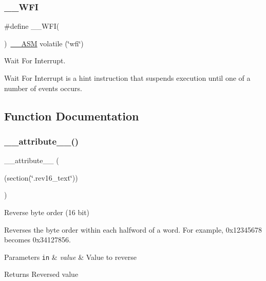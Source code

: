 \subsubsection{\texorpdfstring{\+\_\+\+\_\+\+W\+FI}{\_\_WFI}\hspace{0.1cm}{\footnotesize\ttfamily [3/3]}}
{\footnotesize\ttfamily \#define \+\_\+\+\_\+\+W\+FI(\begin{DoxyParamCaption}{ }\end{DoxyParamCaption})~\mbox{\hyperlink{cmsis__iccarm_8h_a1378040bcf22428955c6e3ce9c2053cd}{\+\_\+\+\_\+\+A\+SM}} volatile (\char`\"{}wfi\char`\"{})}



Wait For Interrupt. 

Wait For Interrupt is a hint instruction that suspends execution until one of a number of events occurs. 

\subsection{Function Documentation}
\mbox{\label{group___c_m_s_i_s___core___instruction_interface_gae84a2733711339c5eefeb0d899506b96}} 
\subsubsection{\texorpdfstring{\+\_\+\+\_\+attribute\+\_\+\+\_\+()}{\_\_attribute\_\_()}\hspace{0.1cm}{\footnotesize\ttfamily [1/3]}}
{\footnotesize\ttfamily \+\_\+\+\_\+attribute\+\_\+\+\_\+ (\begin{DoxyParamCaption}\item[{(section(\char`\"{}.rev16\+\_\+text\char`\"{}))}]{ }\end{DoxyParamCaption})}



Reverse byte order (16 bit) 

Reverses the byte order within each halfword of a word. For example, 0x12345678 becomes 0x34127856. 
\begin{DoxyParams}[1]{Parameters}
\mbox{\tt in}  & {\em value} & Value to reverse \\
\hline
\end{DoxyParams}
\begin{DoxyReturn}{Returns}
Reversed value 
\end{DoxyReturn}
\mbox{\label{group___c_m_s_i_s___core___instruction_interface_gabe2b619a40cc0a7ffa8f765249ccf682}} 
